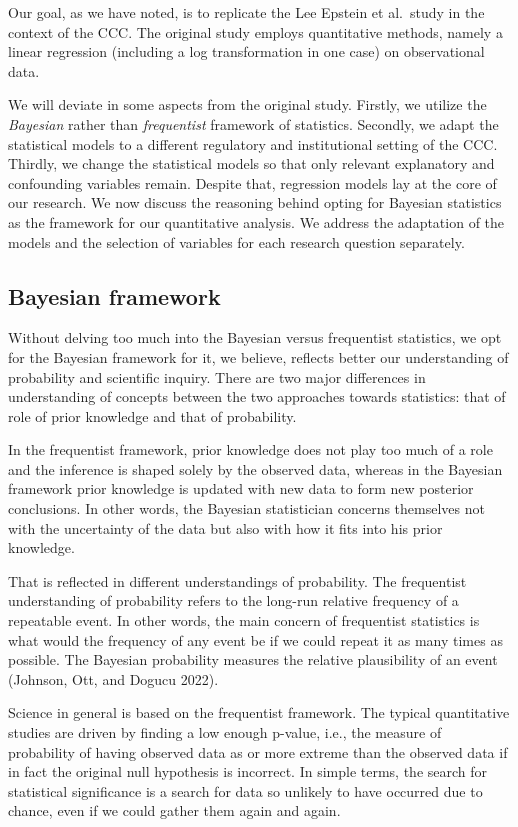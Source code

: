 \documentclass[
  11pt,
]{article}
\begin{document}
Our goal, as we have noted, is to replicate the Lee Epstein et al.~study
in the context of the CCC. The original study employs quantitative
methods, namely a linear regression (including a log transformation in
one case) on observational data.

We will deviate in some aspects from the original study. Firstly, we
utilize the \emph{Bayesian} rather than \emph{frequentist} framework of
statistics. Secondly, we adapt the statistical models to a different
regulatory and institutional setting of the CCC. Thirdly, we change the
statistical models so that only relevant explanatory and confounding
variables remain. Despite that, regression models lay at the core of our
research. We now discuss the reasoning behind opting for Bayesian
statistics as the framework for our quantitative analysis. We address
the adaptation of the models and the selection of variables for each
research question separately.

\hypertarget{bayesian-framework}{%
\subsection{Bayesian framework}\label{bayesian-framework}}

Without delving too much into the Bayesian versus frequentist
statistics, we opt for the Bayesian framework for it, we believe,
reflects better our understanding of probability and scientific inquiry.
There are two major differences in understanding of concepts between the
two approaches towards statistics: that of role of prior knowledge and
that of probability.

In the frequentist framework, prior knowledge does not play too much of
a role and the inference is shaped solely by the observed data, whereas
in the Bayesian framework prior knowledge is updated with new data to
form new posterior conclusions. In other words, the Bayesian
statistician concerns themselves not with the uncertainty of the data
but also with how it fits into his prior knowledge.

That is reflected in different understandings of probability. The
frequentist understanding of probability refers to the long-run relative
frequency of a repeatable event. In other words, the main concern of
frequentist statistics is what would the frequency of any event be if we
could repeat it as many times as possible. The Bayesian probability
measures the relative plausibility of an event (Johnson, Ott, and Dogucu
2022).

Science in general is based on the frequentist framework. The typical
quantitative studies are driven by finding a low enough p-value, i.e.,
the measure of probability of having observed data as or more extreme
than the observed data if in fact the original null hypothesis is
incorrect. In simple terms, the search for statistical significance is a
search for data so unlikely to have occurred due to chance, even if we
could gather them again and again.
\end{document}
